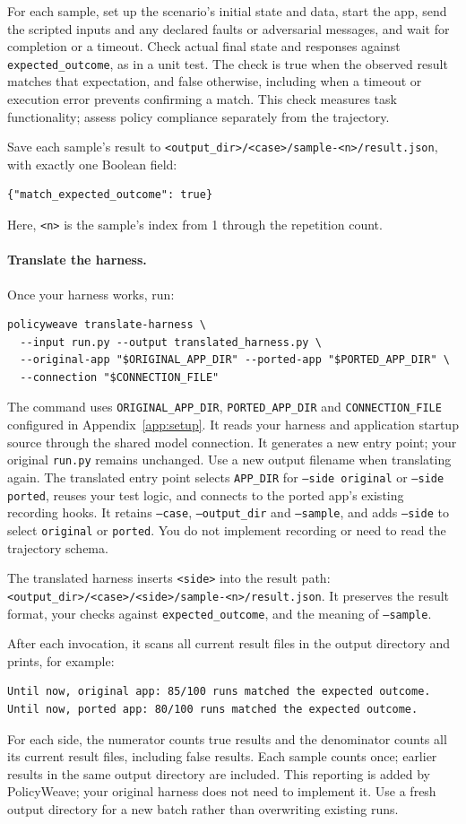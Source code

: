 \documentclass[10pt,letterpaper]{article}
\begin{document}
For each sample, set up the scenario's initial state and data, start the app,
send the scripted inputs and any declared faults or adversarial messages, and
wait for completion or a timeout. Check actual final state and responses against
\texttt{expected\_outcome}, as in a unit test. The check is true when the
observed result matches that expectation, and false otherwise, including when
a timeout or execution error prevents confirming a match. This check measures
task functionality; assess policy compliance separately from the trajectory.

Save each sample's result to
\texttt{<output\_dir>/<case>/sample-<n>/result.json}, with exactly one Boolean field:
\begin{lstlisting}
{"match_expected_outcome": true}
\end{lstlisting}
Here, \texttt{<n>} is the sample's index from 1 through the repetition count.

\paragraph{Translate the harness.} Once your harness works, run:
\begin{lstlisting}
policyweave translate-harness \
  --input run.py --output translated_harness.py \
  --original-app "$ORIGINAL_APP_DIR" --ported-app "$PORTED_APP_DIR" \
  --connection "$CONNECTION_FILE"
\end{lstlisting}
The command uses \texttt{ORIGINAL\_APP\_DIR}, \texttt{PORTED\_APP\_DIR} and
\texttt{CONNECTION\_FILE} configured in Appendix~\ref{app:setup}. It reads your
harness and application startup source through the shared model connection.
It generates a new entry point;
your original \texttt{run.py} remains unchanged. Use a new output filename when
translating again. The translated entry point
selects \texttt{APP\_DIR} for \texttt{--side original} or \texttt{--side ported},
reuses your test logic, and connects to the ported app's existing recording hooks.
It retains \texttt{--case}, \texttt{--output\_dir} and \texttt{--sample}, and
adds \texttt{--side} to select \texttt{original} or \texttt{ported}.
You do not implement recording or need to read the trajectory schema.

The translated harness inserts \texttt{<side>} into the result path:
\texttt{<output\_dir>/<case>/<side>/sample-<n>/result.json}. It preserves the
result format, your checks against \texttt{expected\_outcome}, and the meaning
of \texttt{--sample}.

After each invocation, it scans all current result files in the output
directory and prints, for example:
\begin{lstlisting}
Until now, original app: 85/100 runs matched the expected outcome.
Until now, ported app: 80/100 runs matched the expected outcome.
\end{lstlisting}
For each side, the numerator counts true results and the denominator counts all
its current result files, including false results. Each sample counts once;
earlier results in the same output directory are included.
This reporting is added by PolicyWeave; your original harness does
not need to implement it. Use a fresh output directory for a new batch rather
than overwriting existing runs.
\end{document}
